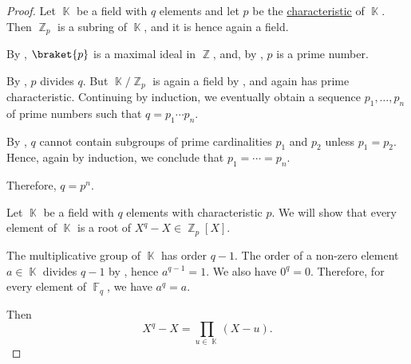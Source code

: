\begin{proof}
   Let \( \BbbK \) be a field with \( q \) elements and let \( p \) be the \hyperref[def:ring_characteristic]{characteristic} of \( \BbbK \). Then \( \BbbZ_p \) is a subring of \( \BbbK \), and it is hence again a field.

  By , \( \braket{ p } \) is a maximal ideal in \( \BbbZ \), and, by , \( p \) is a prime number.

  By , \( p \) divides \( q \). But \( \BbbK / \BbbZ_p \) is again a field by , and again has prime characteristic. Continuing by induction, we eventually obtain a sequence \( p_1, \ldots, p_n \) of prime numbers such that \( q = p_1 \cdots p_n \).

  By , \( q \) cannot contain subgroups of prime cardinalities \( p_1 \) and \( p_2 \) unless \( p_1 = p_2 \). Hence, again by induction, we conclude that \( p_1 = \cdots = p_n \).

  Therefore, \( q = p^n \).

   Let \( \BbbK \) be a field with \( q \) elements with characteristic \( p \). We will show that every element of \( \BbbK \) is a root of \( X^q - X \in \BbbZ_p[X] \).

  The multiplicative group of \( \BbbK \) has order \( q - 1 \). The order of a non-zero element \( a \in \BbbK \) divides \( q - 1 \) by , hence \( a^{q - 1} = 1 \). We also have \( 0^q = 0 \). Therefore, for every element of \( \BbbF_q \), we have \( a^q = a \).

  Then
  \begin{equation*}
    X^q - X = \prod_{u \in \BbbK} (X - u).
  \end{equation*}
\end{proof}

